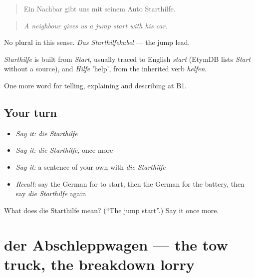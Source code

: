 \begin{quote}
Ein Nachbar gibt uns mit seinem Auto Starthilfe.
\end{quote}

\begin{quote}
\emph{A neighbour gives us a jump start with his car.}
\end{quote}

No plural in this sense. \emph{Das Starthilfekabel} — the jump lead.

\begin{cousinweb}
\emph{Starthilfe} is built from \emph{Start}, usually traced to English \emph{start} (EtymDB lists \emph{Start} without a source), and \emph{Hilfe} 'help', from the inherited verb \emph{helfen}.
\end{cousinweb}

\begin{grammarlens}[title={What you've built}]
One more word for telling, explaining and describing at B1.
\end{grammarlens}

\subsection*{Your turn}
\begin{itemize}
\raggedright
  \item \emph{Say it:} \emph{die Starthilfe}
  \item \emph{Say it:} \emph{die Starthilfe}, once more
  \item \emph{Say it:} a sentence of your own with \emph{die Starthilfe}
  \item \emph{Recall:} say the German for to start, then the German for the battery, then say \emph{die Starthilfe} again
\end{itemize}

\begin{tcolorbox}[breakable,colback=teal!4,colframe=teal!35!black,title={Before you move on}]
What does die Starthilfe mean? (\textquotedblleft{}The jump start\textquotedblright{}.) Say it once more.
\end{tcolorbox}
\section[der Abschleppwagen]{der Abschleppwagen — the tow truck, the breakdown lorry}

\label{lesson:GE-C403-abschleppwagen}



